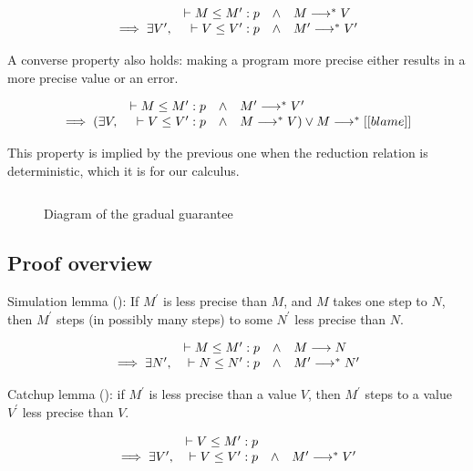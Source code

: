 \newcommand\wwedge{\quad\wedge\quad}

\[
\begin{array}{rrcl}
  & \vdash M \le M^\prime : p & \wedge & M \longrightarrow^\ast V
\\ \implies \exists V^\prime , & \vdash V \le V^\prime : p & \wedge & M^\prime \longrightarrow^\ast V^\prime
\end{array}
\]

A converse property also holds: making a program more precise either results in a more precise value
or an error.

\[
\begin{array}{rrcl}
  & \vdash M \le M^\prime : p & \wedge & M^\prime \longrightarrow^\ast V^\prime
  \\ \implies (\exists V , & \vdash V \le V^\prime : p & \wedge & M \longrightarrow^\ast V) \vee M \longrightarrow^\ast [[blame]]
\end{array}
\]

This property is implied by the previous one when the reduction relation is deterministic, which it is for our calculus.

\begin{figure}
$$

$$
\caption{Diagram of the gradual guarantee}
\label{fig:gg}
\end{figure}

\subsection{Proof overview}

Simulation lemma (): If $M^\prime$ is less precise than $M$, and $M$ takes one step to $N$,
then $M^\prime$ steps (in possibly many steps) to some $N^\prime$ less precise than $N$.

\[
\begin{array}{rrcl}
  & \vdash M \le M^\prime : p & \wedge & M \longrightarrow N
\\ \implies \exists N^\prime , & \vdash N \le N^\prime : p & \wedge & M^\prime \longrightarrow^\ast N^\prime
\end{array}
\]

Catchup lemma (): if $M^\prime$ is less precise than a value $V$, then $M^\prime$ steps
to a value $V^\prime$ less precise than $V$.

\[
\begin{array}{rrcl}
  & \vdash V \le M^\prime : p & &
\\ \implies \exists V^\prime , & \vdash V \le V^\prime : p & \wedge & M^\prime \longrightarrow^\ast V^\prime
\end{array}
\]

